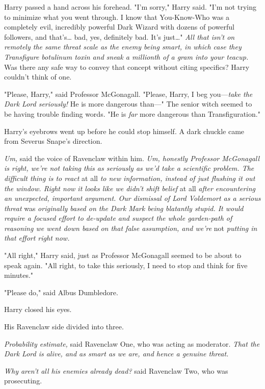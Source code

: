 Harry passed a hand across his forehead. "I'm sorry," Harry said. "I'm not 
trying to minimize what you went through. I know that You-Know-Who was a 
completely evil, incredibly powerful Dark Wizard with dozens of powerful 
followers, and that's{\ldots} bad, yes, definitely bad. It's just{\ldots}" 
\emph{All that isn't on remotely the same threat scale as the enemy being 
smart, in which case they Transfigure botulinum toxin and sneak a millionth of 
a gram into your teacup.} Was there any safe way to convey that concept without 
citing specifics? Harry couldn't think of one.

"Please, Harry," said Professor McGonagall. "Please, Harry, I beg 
you---\emph{take the Dark Lord seriously!} He is more dangerous than---" The 
senior witch seemed to be having trouble finding words. "He is \emph{far} more 
dangerous than Transfiguration."

Harry's eyebrows went up before he could stop himself. A dark chuckle came from 
Severus Snape's direction.

\emph{Um,} said the voice of Ravenclaw within him. \emph{Um, honestly Professor 
McGonagall is right, we're not taking this as seriously as we'd take a 
scientific problem. The difficult thing is to react} at all\emph{ to new 
information, instead of just flushing it out the window. Right now it looks 
like we didn't shift belief} at all\emph{ after encountering an unexpected, 
important argument. Our dismissal of Lord Voldemort as a serious threat} 
was\emph{ originally based on the Dark Mark being blatantly stupid. It would 
require a focused effort to de-update and suspect the whole garden-path of 
reasoning we went down based on that false assumption, and we're} not\emph{ 
putting in that effort right now.}

"All right," Harry said, just as Professor McGonagall seemed to be about to 
speak again. "All right, to take this seriously, I need to stop and think for 
five minutes."

"Please do," said Albus Dumbledore.

Harry closed his eyes.

His Ravenclaw side divided into three.

\emph{Probability estimate,} said Ravenclaw One, who was acting as moderator. 
\emph{That the Dark Lord is alive, and as smart as we are, and hence a genuine 
threat.}

\emph{Why aren't all his enemies already dead?} said Ravenclaw Two, who was 
prosecuting.


